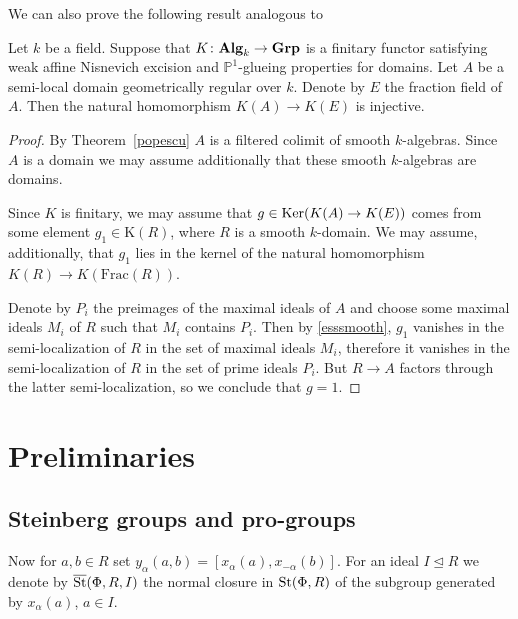 \documentclass[oneside, 11pt]{amsart} \pdfoutput=1
\begin{document}
We can also prove the following result analogous to~\cite[Theorem~1.2]{Sta20}
\begin{theorem}
Let $k$ be a field.
Suppose that $K\colon{\normalfont\textbf{Alg}}_k\rightarrow{\normalfont\textbf{Grp}}$
is a finitary functor satisfying weak affine Nisnevich excision and $\mathbb{P}^1$-glueing properties for domains. 
Let $A$ be a semi-local domain geometrically regular over $k$. 
Denote by $E$ the fraction field of $A$.
Then the natural homomorphism $K(A) \to K(E)$ is injective.
\end{theorem}
\begin{proof}
By Theorem~\ref{popescu} $A$ is a filtered colimit of smooth $k$-algebras. Since $A$ is a domain we may assume additionally that these smooth $k$-algebras are domains.

Since $K$ is finitary, we may assume that $g \in \mathop{\mathrm{Ker}}\nolimits(K(A) \to K(E))$ comes from some element $g_1\in\mathrm K(R)$, where $R$ is a smooth $k$-domain. We may assume, additionally, that $g_1$ lies in the kernel of the natural homomorphism $K(R) \to K(\mathrm{Frac}(R))$.

Denote by $P_i$ the preimages of the maximal ideals of $A$ and choose some maximal ideals $M_i$ of $R$ such that $M_i$ contains $P_i$. Then by \cref{esssmooth}, $g_1$ vanishes in the semi-localization of $R$ in the set of maximal ideals $M_i$, therefore it vanishes in the semi-localization of $R$ in the set of prime ideals $P_i$.
But $R\rightarrow A$ factors through the latter semi-localization, so we conclude that $g=1$. 
\end{proof}

\section{Preliminaries}

\subsection{Steinberg groups and pro-groups}

Now for $a, b \in R$ set $y_\alpha(a, b) = [x_\alpha(a), x_{-\alpha}(b)]$.
For an ideal $I \trianglelefteq R$ we denote by $\overline{\mathop{\mathrm{St}}\nolimits}(\Phi, R, I)$ the normal closure in $\mathop{\mathrm{St}}\nolimits(\Phi, R)$ of the subgroup generated by $x_\alpha(a)$, $a\in I$.
\end{document}
